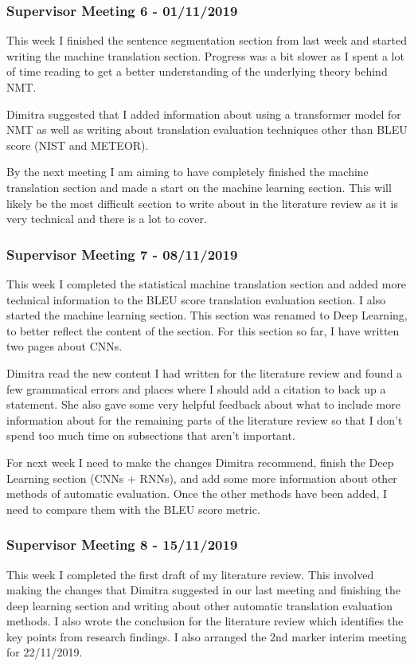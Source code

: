 \subsubsection{Supervisor Meeting 6 - 01/11/2019}
This week I finished the sentence segmentation section from last week and started writing the machine translation section. Progress was a bit slower as I spent a lot of time reading to get a better understanding of the underlying theory behind NMT.

Dimitra suggested that I added information about using a transformer model for NMT as well as writing about translation evaluation techniques other than BLEU score (NIST and METEOR).

By the next meeting I am aiming to have completely finished the machine translation section and made a start on the machine learning section. This will likely be the most difficult section to write about in the literature review as it is very technical and there is a lot to cover.


\subsubsection{Supervisor Meeting 7 - 08/11/2019}
This week I completed the statistical machine translation section and added more technical information to the BLEU score translation evaluation section. I also started the machine learning section. This section was renamed to Deep Learning, to better reflect the content of the section. For this section so far, I have written two pages about CNNs.

Dimitra read the new content I had written for the literature review and found a few grammatical errors and places where I should add a citation to back up a statement. She also gave some very helpful feedback about what to include more information about for the remaining parts of the literature review so that I don’t spend too much time on subsections that aren’t important.

For next week I need to make the changes Dimitra recommend, finish the Deep Learning section (CNNs + RNNs), and add some more information about other methods of automatic evaluation. Once the other methods have been added, I need to compare them with the BLEU score metric.


\subsubsection{Supervisor Meeting 8 - 15/11/2019}
This week I completed the first draft of my literature review. This involved making the changes that Dimitra suggested in our last meeting and finishing the deep learning section and writing about other automatic translation evaluation methods. I also wrote the conclusion for the literature review which identifies the key points from research findings. I also arranged the 2nd marker interim meeting for 22/11/2019.

